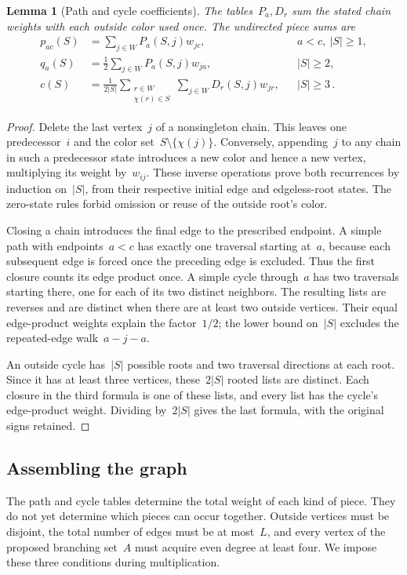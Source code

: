 \documentclass[10pt]{article}
\theoremstyle{plain}
\newtheorem{lemma}[theorem]{Lemma}
\theoremstyle{definition}
\theoremstyle{remark}
\begin{document}
\begin{lemma}[Path and cycle coefficients]\label{lem:sk-primitive-tables}
The tables~$P_a,D_r$ sum the stated chain weights with each outside color used once. The undirected piece sums are
\begin{align}
 p_{ac}(S)&=\sum_{j\in W}P_a(S,j)w_{jc},&&a<c,\ |S|\ge1,\label{eq:sk-path-close}\\
 q_a(S)&=\frac12\sum_{j\in W}P_a(S,j)w_{ja},&&|S|\ge2,\label{eq:sk-return-close}\\
 c(S)&=\frac1{2|S|}\sum_{\substack{r\in W\\\chi(r)\in S}}\sum_{j\in W}D_r(S,j)w_{jr},&&|S|\ge3\,.\label{eq:sk-cycle-close}
\end{align}
\end{lemma}
\begin{proof}
Delete the last vertex~$j$ of a nonsingleton chain. This leaves one predecessor~$i$ and the color set~$S\setminus\{\chi(j)\}$. Conversely, appending~$j$ to any chain in such a predecessor state introduces a new color and hence a new vertex, multiplying its weight by~$w_{ij}$. These inverse operations prove both recurrences by induction on~$|S|$, from their respective initial edge and edgeless-root states. The zero-state rules forbid omission or reuse of the outside root's color.

Closing a chain introduces the final edge to the prescribed endpoint. A simple path with endpoints~$a<c$ has exactly one traversal starting at~$a$, because each subsequent edge is forced once the preceding edge is excluded. Thus the first closure counts its edge product once. A simple cycle through~$a$ has two traversals starting there, one for each of its two distinct neighbors. The resulting lists are reverses and are distinct when there are at least two outside vertices. Their equal edge-product weights explain the factor~$1/2$; the lower bound on~$|S|$ excludes the repeated-edge walk~$a-j-a$.

An outside cycle has~$|S|$ possible roots and two traversal directions at each root. Since it has at least three vertices, these~$2|S|$ rooted lists are distinct. Each closure in the third formula is one of these lists, and every list has the cycle's edge-product weight. Dividing by~$2|S|$ gives the last formula, with the original signs retained.
\end{proof}

\subsection{Assembling the graph}
The path and cycle tables determine the total weight of each kind of piece. They do not yet determine which pieces can occur together. Outside vertices must be disjoint, the total number of edges must be at most~$L$, and every vertex of the proposed branching set~$A$ must acquire even degree at least four. We impose these three conditions during multiplication.
\end{document}
